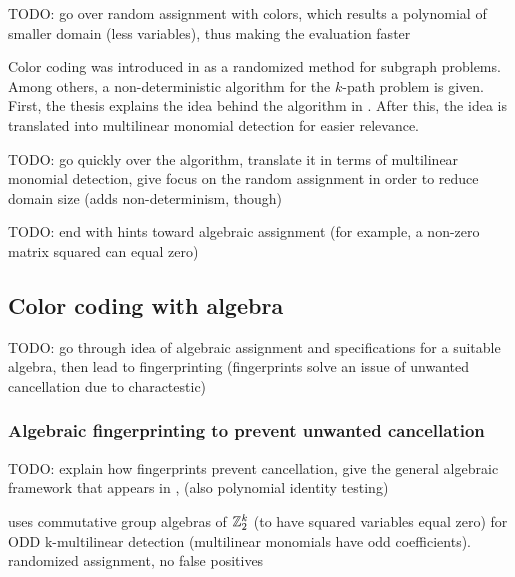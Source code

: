 
TODO: go over random assignment with colors, 
which results a polynomial of smaller domain (less variables), thus 
making the evaluation faster

Color coding was introduced in \cite{Alon95} as a randomized method for subgraph problems. Among others, 
a non-deterministic algorithm for the $k$-path problem is given.
First, the thesis explains the idea behind the algorithm in \cite{Alon95}. 
After this, the idea is translated into multilinear monomial detection for easier relevance.

\begin{problem}
\end{problem}

TODO: go quickly over the algorithm, translate it in terms of multilinear monomial detection, 
give focus on the random assignment in order to reduce domain size (adds non-determinism, though)

TODO: end with hints toward algebraic assignment (for example, a non-zero matrix squared can equal zero)

\subsection{Color coding with algebra}

TODO: go through idea of algebraic assignment and specifications for a suitable algebra, 
then lead to fingerprinting (fingerprints solve an issue of unwanted cancellation due to charactestic)

\subsubsection{Algebraic fingerprinting to prevent unwanted cancellation}

TODO: explain how fingerprints prevent cancellation, 
give the general algebraic framework that appears in \cite{Williams09}, 
(also polynomial identity testing)

\cite{Koutis08} uses commutative group algebras of $\mathbb Z^{k}_{2}$ (to have squared variables equal zero) 
for ODD k-multilinear detection (multilinear monomials have odd coefficients). randomized assignment, no false positives

